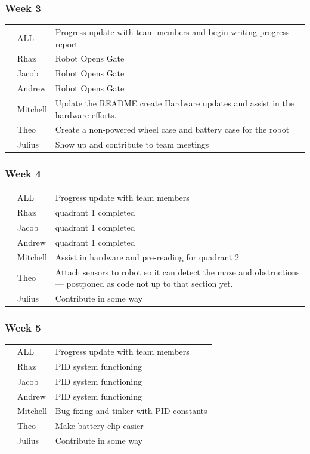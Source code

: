 \documentclass[paper=a4, fontsize=11pt]{scrartcl} %
\def\checkmark{\tikz\fill[scale=0.4] (0,.35) -- (.25,0) -- (1,.7) -- (.25,.15) -- cycle;}
\def\scalecheck{\resizebox{\widthof{\checkmark}*\ratio{\widthof{x}}{\widthof{\normalsize x}}}{!}{\checkmark}}
\numberwithin{equation}{section} %
\numberwithin{figure}{section} %
\begin{document}
\subsubsection*{Week 3}
\begin{tabularx}{\textwidth}{clX}
\scalecheck & ALL      & Progress update with team members and begin writing progress report\\
\scalecheck & Rhaz     & Robot Opens Gate\\
\scalecheck & Jacob    & Robot Opens Gate\\
\scalecheck & Andrew   & Robot Opens Gate\\
\scalecheck & Mitchell & Update the README create Hardware updates and assist in the hardware efforts.\\
\scalecheck & Theo     & Create a non-powered wheel case and battery case for the robot\\
& Julius   & Show up and contribute to team meetings\\
\end{tabularx}

\subsubsection*{Week 4}
\begin{tabularx}{\textwidth}{clX}
\scalecheck & ALL      & Progress update with team members\\
\scalecheck & Rhaz     & quadrant 1 completed\\
\scalecheck & Jacob    & quadrant 1 completed\\
\scalecheck & Andrew   & quadrant 1 completed\\
\scalecheck & Mitchell & Assist in hardware and pre-reading for quadrant 2\\

& Theo     & Attach sensors to robot so it can detect the maze and obstructions --- postponed as code not up to that section yet.\\
& Julius   & Contribute in some way\\
\end{tabularx}

\subsubsection*{Week 5}
\begin{tabularx}{\textwidth}{clX}
\scalecheck & ALL      & Progress update with team members\\
\scalecheck & Rhaz     & PID system functioning\\
\scalecheck & Jacob    & PID system functioning\\
\scalecheck & Andrew   & PID system functioning\\
\scalecheck & Mitchell & Bug fixing and tinker with PID constants\\
\scalecheck & Theo     & Make battery clip easier\\
& Julius   & Contribute in some way\\
\end{tabularx}
\end{document}

